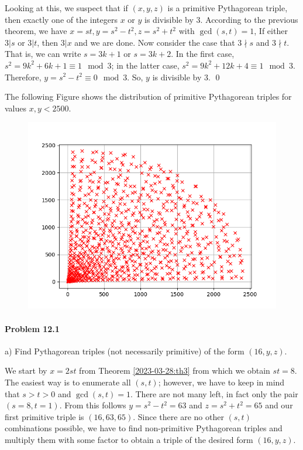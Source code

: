 Looking at this, we suspect that if $(x , y, z)$ is a primitive Pythagorean triple, then exactly one of the integers $x$ or $y$ is divisible by $3$. According to the previous theorem, we have $x=st, y=s^2-t^2, z=s^2+t^2$ with $\gcd(s,t)=1$, If either $3|s$ or $3|t$, then $3|x$ and we are done. Now consider the case that $3 \nmid s$ and $3 \nmid t$. That is, we can write $s = 3k+1$ or $s=3k+2$. In the first case, $s^2 =  9k^2 + 6k + 1 \equiv 1 \mod 3$; in the latter case, $s^2 = 9k^2 + 12k + 4 \equiv 1 \mod 3$. Therefore, $y = s^2 - t^2 \equiv 0 \mod 3$. So, $y$ is divisible by $3$. \qed

The following Figure shows the distribution of primitive Pythagorean triples for values $x, y < 2500$.

\begin{figure}[H]
    \centering
    \includegraphics[scale=0.75]{images/2023-03-28-triples_2.png}
\end{figure}


\paragraph{Problem 12.1} a) Find Pythagorean triples (not necessarily primitive) of the form $(16,y,z)$.

We start by $x= 2st$ from Theorem \ref{2023-03-28:th3} from which we obtain $st = 8$. The easiest way is to enumerate all $(s,t)$; however, we have to keep in mind that $s > t > 0$ and $\gcd(s,t) = 1$. There are not many left, in fact only the pair $(s=8, t=1)$. From this follows $y = s^2 - t^2 = 63$ and $z = s^2 + t^2 = 65$ and our first primitive triple is $(16, 63, 65)$. Since there are no other $(s,t)$ combinations possible, we have to find non-primitive Pythagorean triples and multiply them with some factor to obtain a triple of the desired form $(16, y, z)$.

